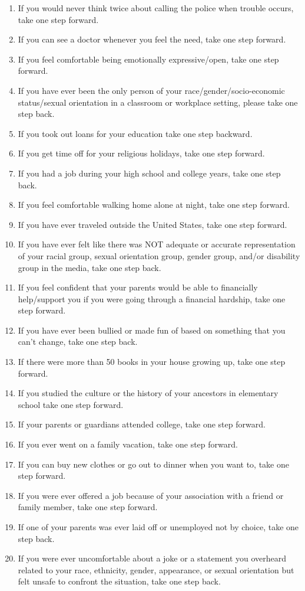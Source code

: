 \documentclass[11pt, twoside]{article}
\begin{document}
\begin{enumerate}
		\item If you would never think twice about calling the police when trouble occurs, take one step forward.
		\item If you can see a doctor whenever you feel the need, take one step forward.
		\item If you feel comfortable being emotionally expressive/open, take one step forward.
		\item If you have ever been the only person of your race/gender/socio-economic status/sexual orientation in a classroom or workplace setting, please take one step back.
		\item If you took out loans for your education take one step backward.
		\item If you get time off for your religious holidays, take one step forward.
		\item If you had a job during your high school and college years, take one step back.
		\item If you feel comfortable walking home alone at night, take one step forward.
		\item If you have ever traveled outside the United States, take one step forward.
		\item If you have ever felt like there was NOT adequate or accurate representation of your racial group, sexual orientation group, gender group, and/or disability group in the media, take one step back.
		\item If you feel confident that your parents would be able to financially help/support you if you were going through a financial hardship, take one step forward.
		\item If you have ever been bullied or made fun of based on something that you can’t change, take one step back.
		\item If there were more than 50 books in your house growing up, take one step forward.
		\item If you studied the culture or the history of your ancestors in elementary school take one step forward.
		\item If your parents or guardians attended college, take one step forward.
		\item If you ever went on a family vacation, take one step forward.
		\item If you can buy new clothes or go out to dinner when you want to, take one step forward.
		\item If you were ever offered a job because of your association with a friend or family member, take one step forward.
		\item If one of your parents was ever laid off or unemployed not by choice, take one step back.
		\item If you were ever uncomfortable about a joke or a statement you overheard related to your race, ethnicity, gender, appearance, or sexual orientation but felt unsafe to confront the situation, take one step back.
	\end{enumerate}
\end{document}
